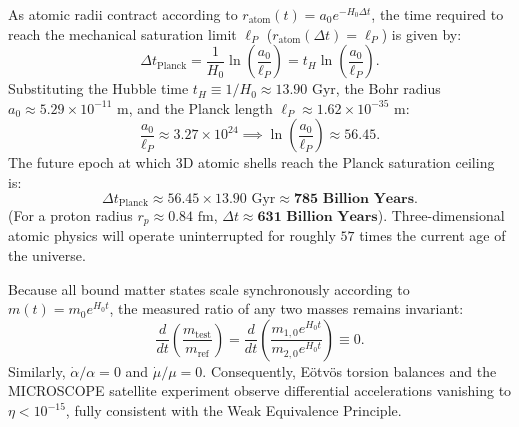 \begin{corollary}
    \label{cor:planck_boyuna_inme_zamani_monograph}
    As atomic radii contract according to $r_{\mathrm{atom}}(t) = a_0 e^{-H_0 \Delta t}$, the time required to reach the mechanical saturation limit $\ell_P$ ($r_{\mathrm{atom}}(\Delta t) = \ell_P$) is given by:
    \begin{equation}
        \Delta t_{\mathrm{Planck}} = \frac{1}{H_0} \ln\left( \frac{a_0}{\ell_P} \right) = t_H \ln\left( \frac{a_0}{\ell_P} \right).
        \label{eq:planck_zamani_hesap_monograph}
    \end{equation}
    Substituting the Hubble time $t_H \equiv 1/H_0 \approx 13.90\text{ Gyr}$, the Bohr radius $a_0 \approx 5.29 \times 10^{-11}\text{ m}$, and the Planck length $\ell_P \approx 1.62 \times 10^{-35}\text{ m}$:
    \begin{equation}
        \frac{a_0}{\ell_P} \approx 3.27 \times 10^{24} \implies \ln\left( \frac{a_0}{\ell_P} \right) \approx 56.45.
    \end{equation}
    The future epoch at which 3D atomic shells reach the Planck saturation ceiling is:
    \begin{equation}
        \Delta t_{\mathrm{Planck}} \approx 56.45 \times 13.90\text{ Gyr} \approx \mathbf{785\text{ Billion Years}}.
        \label{eq:785_milyar_yil_monograph}
    \end{equation}
    (For a proton radius $r_p \approx 0.84\text{ fm}$, $\Delta t \approx \mathbf{631\text{ Billion Years}}$). Three-dimensional atomic physics will operate uninterrupted for roughly $57$ times the current age of the universe.
\end{corollary}

\begin{theorem}
    \label{thm:boyutsuz_oranlar}
    Because all bound matter states scale synchronously according to $m(t) = m_0 e^{H_0 t}$, the measured ratio of any two masses remains invariant:
    \begin{equation}
        \frac{d}{dt}\left( \frac{m_{\mathrm{test}}}{m_{\mathrm{ref}}} \right) = \frac{d}{dt}\left( \frac{m_{1,0} e^{H_0 t}}{m_{2,0} e^{H_0 t}} \right) \equiv 0.
        \label{eq:boyutsuz_kutle_korunumu}
    \end{equation}
    Similarly, $\dot{\alpha}/\alpha = 0$ and $\dot{\mu}/\mu = 0$. Consequently, Eötvös torsion balances and the MICROSCOPE satellite experiment observe differential accelerations vanishing to $\eta < 10^{-15}$, fully consistent with the Weak Equivalence Principle.
\end{theorem}

